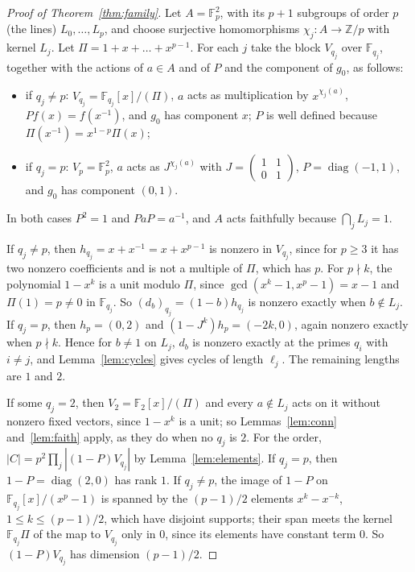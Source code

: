 \documentclass[11pt]{article}
\newcommand{\F}{\mathbb{F}}
\begin{document}
\begin{proof}[Proof of Theorem~\ref{thm:family}]
Let $A=\F_p^2$, with its $p+1$ subgroups of order $p$ (the lines)
$L_0,\dots,L_p$, and choose surjective homomorphisms $\chi_j\colon
A\to\mathbb{Z}/p$ with kernel $L_j$. Let $\Pi=1+x+\dots+x^{p-1}$. For each
$j$ take the block $V_{q_j}$ over $\F_{q_j}$, together with the actions of
$a\in A$ and of $P$ and the component of $g_0$, as follows:
\begin{itemize}
\item if $q_j\ne p$: $V_{q_j}=\F_{q_j}[x]/(\Pi)$, $a$ acts as
multiplication by $x^{\chi_j(a)}$, $Pf(x)=f(x^{-1})$, and $g_0$ has
component $x$; $P$ is well defined because $\Pi(x^{-1})=x^{1-p}\Pi(x)$;
\item if $q_j=p$: $V_p=\F_p^2$, $a$ acts as $J^{\chi_j(a)}$ with
$J=\left(\begin{smallmatrix}1&1\\0&1\end{smallmatrix}\right)$,
$P=\operatorname{diag}(-1,1)$, and $g_0$ has component $(0,1)$.
\end{itemize}
In both cases $P^2=1$ and $PaP=a^{-1}$, and $A$ acts faithfully because
$\bigcap_jL_j=1$.

If $q_j\ne p$, then $h_{q_j}=x+x^{-1}=x+x^{p-1}$ is nonzero in $V_{q_j}$,
since for $p\ge3$ it has two nonzero coefficients and is not a multiple of
$\Pi$, which has $p$. For $p\nmid k$, the polynomial $1-x^k$ is a unit
modulo $\Pi$, since $\gcd(x^k-1,x^p-1)=x-1$ and $\Pi(1)=p\ne0$ in
$\F_{q_j}$. So $(d_b)_{q_j}=(1-b)h_{q_j}$ is nonzero exactly when $b\notin
L_j$. If $q_j=p$, then $h_p=(0,2)$ and $(1-J^k)h_p=(-2k,0)$, again nonzero
exactly when $p\nmid k$. Hence for $b\ne1$ on $L_j$, $d_b$ is nonzero
exactly at the primes $q_i$ with $i\ne j$, and Lemma~\ref{lem:cycles} gives
cycles of length $\ell_j$. The remaining lengths are $1$ and $2$.

If some $q_j=2$, then $V_2=\F_2[x]/(\Pi)$ and every $a\notin L_j$ acts on
it without nonzero fixed vectors, since $1-x^k$ is a unit; so
Lemmas~\ref{lem:conn} and~\ref{lem:faith} apply, as they do when no $q_j$
is $2$. For the order, $|C|=p^2\prod_j|(1-P)V_{q_j}|$ by
Lemma~\ref{lem:elements}. If $q_j=p$, then $1-P=\operatorname{diag}(2,0)$
has rank $1$. If $q_j\ne p$, the image of $1-P$ on
$\F_{q_j}[x]/(x^p-1)$ is spanned by the $(p-1)/2$ elements $x^k-x^{-k}$,
$1\le k\le (p-1)/2$, which have disjoint supports; their span meets the
kernel $\F_{q_j}\Pi$ of the map to $V_{q_j}$ only in $0$, since its elements
have constant term $0$. So $(1-P)V_{q_j}$ has dimension $(p-1)/2$.


\end{proof}
\end{document}
